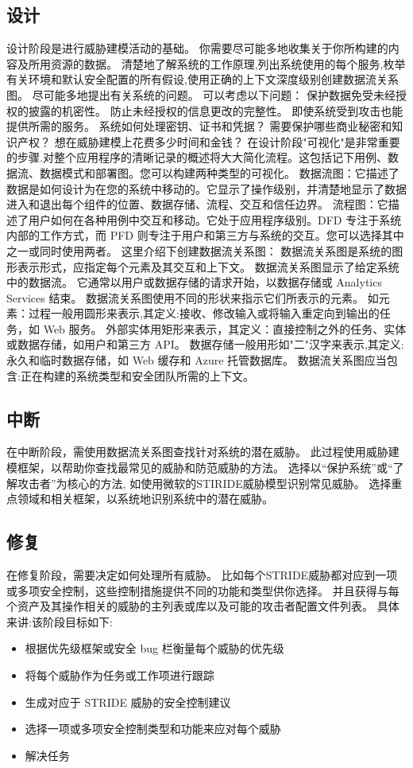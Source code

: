 \subsection{设计}
设计阶段是进行威胁建模活动的基础。 你需要尽可能多地收集关于你所构建的内容及所用资源的数据。
清楚地了解系统的工作原理,列出系统使用的每个服务,枚举有关环境和默认安全配置的所有假设,使用正确的上下文深度级别创建数据流关系图。
尽可能多地提出有关系统的问题。 可以考虑以下问题：
保护数据免受未经授权的披露的机密性。
防止未经授权的信息更改的完整性。
即使系统受到攻击也能提供所需的服务。
系统如何处理密钥、证书和凭据？
需要保护哪些商业秘密和知识产权？
想在威胁建模上花费多少时间和金钱？
\newline
在设计阶段"可视化"是非常重要的步骤.对整个应用程序的清晰记录的概述将大大简化流程。这包括记下用例、数据流、数据模式和部署图。您可以构建两种类型的可视化。
数据流图：它描述了数据是如何设计为在您的系统中移动的。它显示了操作级别，并清楚地显示了数据进入和退出每个组件的位置、数据存储、流程、交互和信任边界。 
流程图：它描述了用户如何在各种用例中交互和移动。它处于应用程序级别。DFD 专注于系统内部的工作方式，而 PFD 则专注于用户和第三方与系统的交互。您可以选择其中之一或同时使用两者。
这里介绍下创建数据流关系图： 数据流关系图是系统的图形表示形式，应指定每个元素及其交互和上下文。
数据流关系图显示了给定系统中的数据流。 它通常以用户或数据存储的请求开始，以数据存储或 Analytics Services 结束。 数据流关系图使用不同的形状来指示它们所表示的元素。
如元素：过程一般用圆形来表示,其定义:接收、修改输入或将输入重定向到输出的任务，如 Web 服务。
外部实体用矩形来表示，其定义：直接控制之外的任务、实体或数据存储，如用户和第三方 API。
数据存储一般用形如"二"汉字来表示,其定义:永久和临时数据存储，如 Web 缓存和 Azure 托管数据库。
数据流关系图应当包含:正在构建的系统类型和安全团队所需的上下文。	

\subsection{中断}
在中断阶段，需使用数据流关系图查找针对系统的潜在威胁。 此过程使用威胁建模框架，以帮助你查找最常见的威胁和防范威胁的方法。
选择以“保护系统”或“了解攻击者”为核心的方法, 如使用微软的STIRIDE威胁模型识别常见威胁。
选择重点领域和相关框架，以系统地识别系统中的潜在威胁。

\subsection{修复}

在修复阶段，需要决定如何处理所有威胁。 比如每个STRIDE威胁都对应到一项或多项安全控制，这些控制措施提供不同的功能和类型供你选择。
并且获得与每个资产及其操作相关的威胁的主列表或库以及可能的攻击者配置文件列表。
具体来讲:该阶段目标如下:
\begin{itemize}
    \item 根据优先级框架或安全 bug 栏衡量每个威胁的优先级
    \item 将每个威胁作为任务或工作项进行跟踪
    \item 生成对应于 STRIDE 威胁的安全控制建议
    \item 选择一项或多项安全控制类型和功能来应对每个威胁
    \item 解决任务
  \end{itemize}

